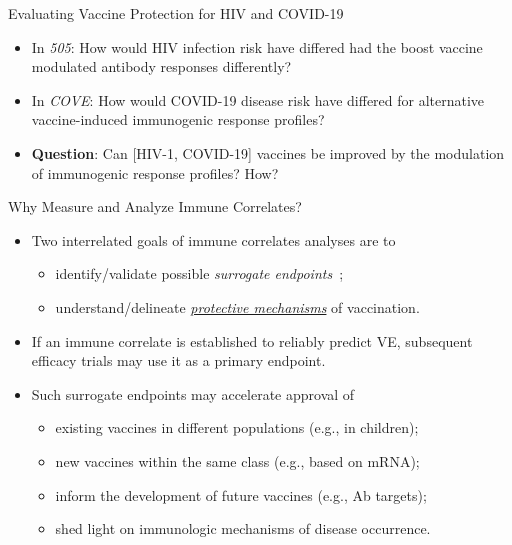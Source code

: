 \documentclass{beamer}
\begin{document}
\begin{frame}[c]{Evaluating Vaccine Protection for HIV and COVID-19}

\begin{center}
\begin{itemize}
  \itemsep8pt
  \item In \textit{505}: How would HIV infection risk have differed had
    the boost vaccine modulated antibody responses differently?
  \item In \textit{COVE}: How would COVID-19 disease risk have differed for
    alternative vaccine-induced immunogenic response profiles?
  \item \textbf{Question}: Can [HIV-1, COVID-19] vaccines be improved by the
    modulation of immunogenic response profiles? How?
\end{itemize}
\end{center}

\note{
}

\end{frame}


\begin{frame}[c]{Why Measure and Analyze Immune Correlates?}

\begin{center}
\begin{itemize}
  \itemsep8pt
  \item Two interrelated goals of immune correlates analyses are to
    \begin{itemize}
      \itemsep0pt
      \item identify/validate possible \textit{surrogate
        endpoints}~\citep{prentice1989surrogate};
      \item understand/delineate \underline{\textit{protective mechanisms}} of
        vaccination.
    \end{itemize}
  \item If an immune correlate is established to reliably predict VE,
    subsequent efficacy trials may use it as a primary endpoint.
  \item Such surrogate endpoints may accelerate approval of
    \begin{itemize}
      \itemsep0pt
      \item existing vaccines in different populations (e.g., in children);
      \item new vaccines within the same class (e.g., based on mRNA);
      \item inform the development of future vaccines (e.g., Ab targets);
      \item shed light on immunologic mechanisms of disease occurrence.
    \end{itemize}
\end{itemize}
\end{center}

\note{
}

\end{frame}
\end{document}
